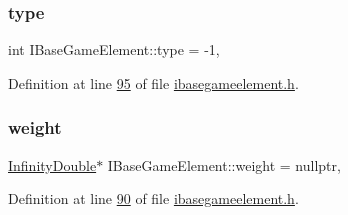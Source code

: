 \subsubsection{\texorpdfstring{type}{type}}
{\footnotesize\ttfamily int I\+Base\+Game\+Element\+::type = -\/1\hspace{0.3cm}{\ttfamily [protected]}, {\ttfamily [inherited]}}



Definition at line \hyperlink{a00047_source_l00095}{95} of file \hyperlink{a00047_source}{ibasegameelement.\+h}.

\mbox{\label{a00137_a99901016531fd27b9b197dc88d3bfa4a}} 
\subsubsection{\texorpdfstring{weight}{weight}}
{\footnotesize\ttfamily \hyperlink{a00161}{Infinity\+Double}$\ast$ I\+Base\+Game\+Element\+::weight = nullptr\hspace{0.3cm}{\ttfamily [protected]}, {\ttfamily [inherited]}}



Definition at line \hyperlink{a00047_source_l00090}{90} of file \hyperlink{a00047_source}{ibasegameelement.\+h}.

